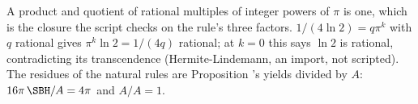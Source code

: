 A product and quotient of rational multiples of integer powers of $\pi$ is one, which is the closure the script checks on the rule's three factors. $1/(4\ln 2) = q\pi^k$ with $q$ rational gives $\pi^k\ln 2 = 1/(4q)$ rational; at $k = 0$ this says $\ln 2$ is rational, contradicting its transcendence (Hermite-Lindemann, an import, not scripted). The residues of the natural rules are Proposition 's yields divided by $A$: $16\pi\,\SBH/A = 4\pi$ and $A/A = 1$.

